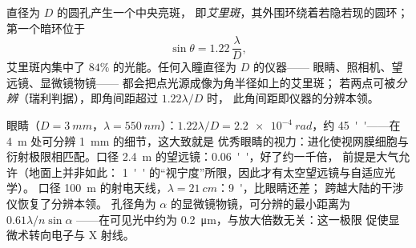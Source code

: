 \begin{proposition}\label{prop:b2:diffraction:airy}
直径为 $D$ 的圆孔产生一个中央亮斑，
即\emph{艾里斑}，其外围环绕着若隐若现的圆环；第一个暗环位于
\[
\sin\theta = 1.22\,\frac\lambda D ,
\]
艾里斑内集中了 $84\%$ 的光能。任何入瞳直径为 $D$ 的仪器——
眼睛、照相机、望远镜、显微镜物镜——
都会把点光源成像为角半径如上的艾里斑；
若两点可被\emph{分辨}（瑞利判据），即角间距超过
$1.22\lambda/D$ 时，
此角间距即仪器的分辨本领。
\end{proposition}
\admitted

\begin{example}\label{ex:b2:diffraction:instruments}
眼睛（$D = \qty{3}{mm}$，$\lambda = \qty{550}{nm}$）：$1.22\lambda/D = \qty{2.2e-4}{rad}$，约
\qty{45}{''}——在 \qty{4}{m} 处可分辨 \qty{1}{mm} 的细节，这大致就是
优秀眼睛的视力：进化使视网膜细胞与
衍射极限相匹配。口径 \qty{2.4}{m} 的望远镜：\qty{0.06}{''}，好了约一千倍，
前提是大气允许（地面上并非如此：
\qty{1}{''} 的“视宁度”所限，因此才有太空望远镜与自适应光学）。
口径 \qty{100}{m} 的射电天线，$\lambda = \qty{21}{cm}$：\qty{9}{'}，比眼睛还差；
跨越大陆的干涉仪恢复了分辨本领。
孔径角为 $\alpha$ 的显微镜物镜，可分辨的最小距离为 $0.61\lambda/n\sin\alpha$
——在可见光中约为 \qty{0.2}{\micro m}，与放大倍数无关：这一极限
促使显微术转向电子与 X 射线。
\end{example}

